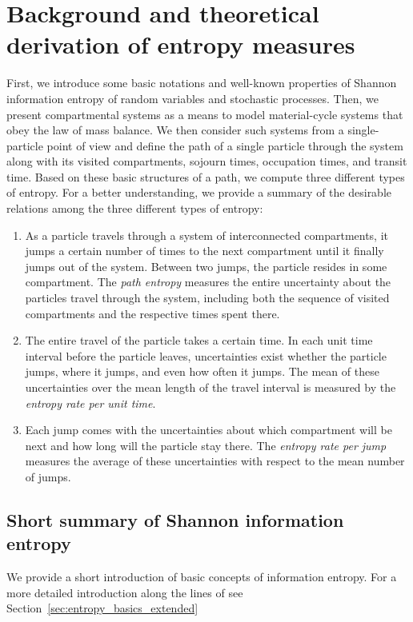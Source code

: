 \documentclass[smallextended]{svjour3}
\begin{document}
\section{Background and theoretical derivation of entropy measures}
First, we introduce some basic notations and well-known properties of Shannon information entropy of random variables and stochastic processes.
Then, we present compartmental systems as a means to model material-cycle systems that obey the law of mass balance.
We then consider such systems from a single-particle point of view and define the path of a single particle through the system along with its visited compartments, sojourn times, occupation times, and transit time.
Based on these basic structures of a path, we compute three different types of entropy.
For a better understanding, we provide a summary of the desirable relations among the three different types of entropy:
\begin{enumerate}[(1)]
  \item 	As a particle travels through a system of interconnected compartments, it jumps a certain number of times to the next compartment until it finally jumps out of the system.
	Between two jumps, the particle resides in some compartment.
  The \emph{path entropy} measures the entire uncertainty about the particles travel through the system, including both the sequence of visited compartments and the respective times spent there.

	\item The entire travel of the particle takes a certain time.
	In each unit time interval before the particle leaves, uncertainties exist whether the particle jumps, where it jumps, and even how often it jumps.
	The mean of these uncertainties over the mean length of the travel interval is measured by the \emph{entropy rate per unit time}.

	\item Each jump comes with the uncertainties about which compartment will be next and how long will the particle stay there.
	The \emph{entropy rate per jump} measures the average of these uncertainties with respect to the mean number of jumps.
\end{enumerate}


\subsection{Short summary of Shannon information entropy}
\label{sec:entropy_basics}

We provide a short introduction of basic concepts of information entropy.
For a more detailed introduction along the lines of \citet{Cover2006} see Section~\ref{sec:entropy_basics_extended}
\end{document}
